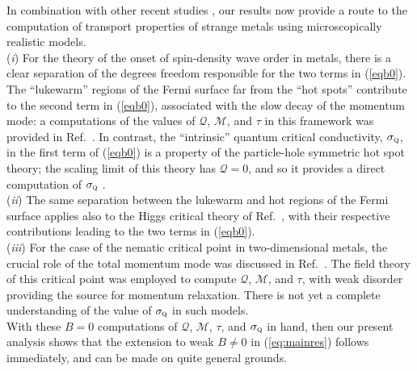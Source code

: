 \documentclass[10pt, oneside]{book}
\begin{document}
\begin{doublespace}
In combination with other recent studies \cite{Hartnoll:2014gba,Patel:2014jfa,DHSS15,strack1}, our results now provide a route to the computation of transport properties
of strange metals using microscopically realistic models. \\
({\em i\/}) For the theory of the onset of spin-density wave order in metals, there is a clear separation of the 
degrees freedom responsible for the two terms in (\ref{eqb0}). The ``lukewarm'' regions of the Fermi surface far from the ``hot spots''
contribute to the second term in (\ref{eqb0}), associated with the slow decay of the momentum mode: a computations of the values of $\mathcal{Q}$, 
$\mathcal{M}$, and $\tau$ in this framework was provided in Ref.~\cite{Patel:2014jfa}. In contrast, the ``intrinsic'' quantum critical conductivity, $\sigma_{\textsc{q}}$,
in the first term of (\ref{eqb0}) 
is a property of the particle-hole symmetric hot spot theory; the scaling limit of this theory has $\mathcal{Q}=0$, and so it provides a direct computation 
of $\sigma_{\textsc{q}}$ \cite{strack1}.\\
({\em ii\/}) The same separation between the lukewarm and hot regions of the Fermi surface applies also to the Higgs critical theory of Ref.~\cite{DHSS15}, 
with their respective contributions leading to the two terms in (\ref{eqb0}).\\
({\em iii\/}) For the case of the nematic critical point in 
two-dimensional metals, 
the crucial role of the total momentum mode was discussed in Ref.~\cite{Hartnoll:2014gba}.  The field theory of this critical point was employed to compute $\mathcal{Q}$, 
$\mathcal{M}$, and $\tau$, with weak disorder providing the source for momentum relaxation. There is not yet a complete understanding of the value of
$\sigma_{\textsc{q}}$ in such models.\\
With these $B=0$ computations of $\mathcal{Q}$, 
$\mathcal{M}$, $\tau$, and $\sigma_{\textsc{q}}$ in hand, then our present analysis shows that the extension to weak $B\neq 0$ in (\ref{eq:mainres}) follows immediately, 
and can be made on quite general grounds.  


\end{doublespace}
\end{document}
